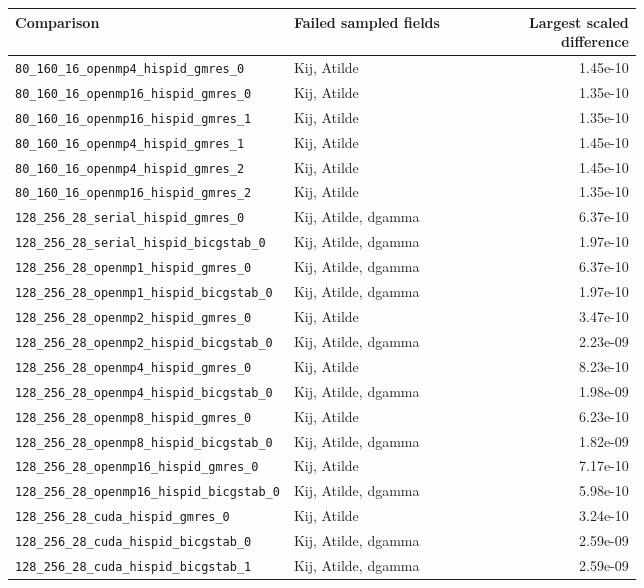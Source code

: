 \documentclass[11pt]{article}
\begin{document}
\scriptsize\begin{longtable}{p{0.44\linewidth}p{0.29\linewidth}r}
\toprule Comparison & Failed sampled fields & Largest scaled difference\\\midrule\endhead
\nolinkurl{80_160_16_openmp4_hispid_gmres_0} & Kij, Atilde & 1.45e-10\\
\nolinkurl{80_160_16_openmp16_hispid_gmres_0} & Kij, Atilde & 1.35e-10\\
\nolinkurl{80_160_16_openmp16_hispid_gmres_1} & Kij, Atilde & 1.35e-10\\
\nolinkurl{80_160_16_openmp4_hispid_gmres_1} & Kij, Atilde & 1.45e-10\\
\nolinkurl{80_160_16_openmp4_hispid_gmres_2} & Kij, Atilde & 1.45e-10\\
\nolinkurl{80_160_16_openmp16_hispid_gmres_2} & Kij, Atilde & 1.35e-10\\
\nolinkurl{128_256_28_serial_hispid_gmres_0} & Kij, Atilde, dgamma & 6.37e-10\\
\nolinkurl{128_256_28_serial_hispid_bicgstab_0} & Kij, Atilde, dgamma & 1.97e-10\\
\nolinkurl{128_256_28_openmp1_hispid_gmres_0} & Kij, Atilde, dgamma & 6.37e-10\\
\nolinkurl{128_256_28_openmp1_hispid_bicgstab_0} & Kij, Atilde, dgamma & 1.97e-10\\
\nolinkurl{128_256_28_openmp2_hispid_gmres_0} & Kij, Atilde & 3.47e-10\\
\nolinkurl{128_256_28_openmp2_hispid_bicgstab_0} & Kij, Atilde, dgamma & 2.23e-09\\
\nolinkurl{128_256_28_openmp4_hispid_gmres_0} & Kij, Atilde & 8.23e-10\\
\nolinkurl{128_256_28_openmp4_hispid_bicgstab_0} & Kij, Atilde, dgamma & 1.98e-09\\
\nolinkurl{128_256_28_openmp8_hispid_gmres_0} & Kij, Atilde & 6.23e-10\\
\nolinkurl{128_256_28_openmp8_hispid_bicgstab_0} & Kij, Atilde, dgamma & 1.82e-09\\
\nolinkurl{128_256_28_openmp16_hispid_gmres_0} & Kij, Atilde & 7.17e-10\\
\nolinkurl{128_256_28_openmp16_hispid_bicgstab_0} & Kij, Atilde, dgamma & 5.98e-10\\
\nolinkurl{128_256_28_cuda_hispid_gmres_0} & Kij, Atilde & 3.24e-10\\
\nolinkurl{128_256_28_cuda_hispid_bicgstab_0} & Kij, Atilde, dgamma & 2.59e-09\\
\nolinkurl{128_256_28_cuda_hispid_bicgstab_1} & Kij, Atilde, dgamma & 2.59e-09\\

\end{longtable}
\end{document}
